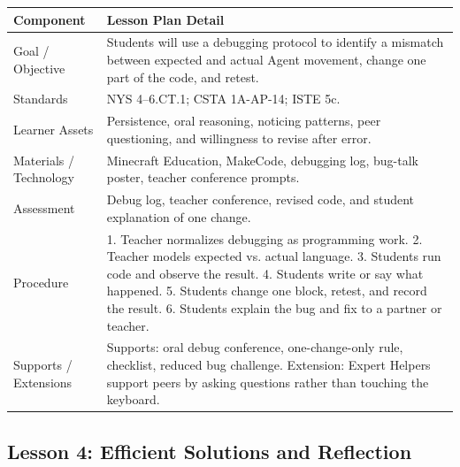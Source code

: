 \documentclass[12pt]{article}
\begin{document}
\begin{xltabular}{\textwidth}{|P{1.45in}|L|}
\hline
{}\color{white}\bfseries Component & \color{white}\bfseries Lesson Plan Detail \\
\hline
Goal / Objective & Students will use a debugging protocol to identify a mismatch between expected and actual Agent movement, change one part of the code, and retest. \\
\hline
{} Standards & NYS 4--6.CT.1; CSTA 1A-AP-14; ISTE 5c. \\
\hline
Learner Assets & Persistence, oral reasoning, noticing patterns, peer questioning, and willingness to revise after error. \\
\hline
{} Materials / Technology & Minecraft Education, MakeCode, debugging log, bug-talk poster, teacher conference prompts. \\
\hline
Assessment & Debug log, teacher conference, revised code, and student explanation of one change. \\
\hline
{} Procedure & 1. Teacher normalizes debugging as programming work. 2. Teacher models expected vs. actual language. 3. Students run code and observe the result. 4. Students write or say what happened. 5. Students change one block, retest, and record the result. 6. Students explain the bug and fix to a partner or teacher. \\
\hline
Supports / Extensions & Supports: oral debug conference, one-change-only rule, checklist, reduced bug challenge. Extension: Expert Helpers support peers by asking questions rather than touching the keyboard. \\
\hline
\end{xltabular}

\newpage
\subsection{Lesson 4: Efficient Solutions and Reflection}
\end{document}
